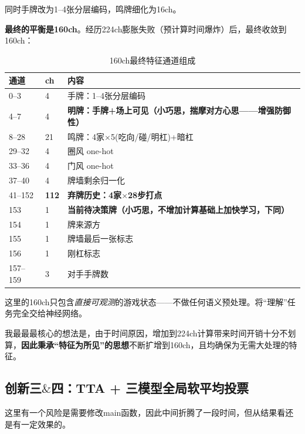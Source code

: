 \documentclass{article}
\begin{document}
同时手牌改为1--4张分层编码，鸣牌细化为16ch。

\textbf{最终的平衡是160ch}。经历224ch膨胀失败（预计算时间爆炸）后，最终收敛到160ch：

\begin{table}[ht]
\caption{160ch最终特征通道组成}
\label{tab:channels}
\begin{center}
\footnotesize
\begin{tabular}{lp{0.7cm}p{3.6cm}}
\toprule
通道 & ch & 内容 \\
\midrule
0--3   & 4   & 手牌：1--4张分层编码 \\
4--7   & 4   & \textbf{明牌：手牌+场上可见（小巧思，揣摩对方心思——增强防御性）} \\
8--28  & 21  & 鸣牌：4家$\times$5(吃向/碰/明杠)+暗杠 \\
29--32 & 4   & 圈风 one-hot \\
33--36 & 4   & 门风 one-hot \\
37--40 & 4   & 牌墙剩余归一化 \\
41--152 & \textbf{112} & \textbf{弃牌历史：4家$\times$28步打点} \\
153    & 1   & \textbf{当前待决策牌（小巧思，不增加计算基础上加快学习，下同）} \\
154    & 1   & 牌来源方 \\
155    & 1   & 牌墙最后一张标志 \\
156    & 1   & 刚杠标志 \\
157--159 & 3 & 对手手牌数 \\
\bottomrule
\end{tabular}
\end{center}
\end{table}

这里的160ch只包含\emph{直接可观测}的游戏状态——不做任何语义预处理。将``理解''任务完全交给神经网络。

我最最最核心的想法是，由于时间原因，增加到224ch计算带来时间开销十分不划算，\textbf{因此秉承``特征为所见''的思想}不断扩增到160ch，且均确保为无需大处理的特征。

\subsection{创新三$\boldsymbol{\&}$四：TTA + 三模型全局软平均投票}

这里有一个风险是需要修改main函数，因此中间折腾了一段时间，但从结果看还是有一定效果的。
\end{document}
